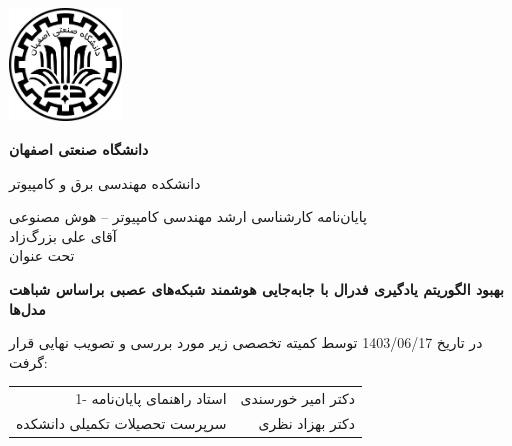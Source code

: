 \thispagestyle{empty}
\begin{center}
\includegraphics[height=3cm]{iut_logo.png}
\vspace{0.4cm}

\textbf{دانشگاه صنعتی اصفهان}\\
\vspace{0.4cm}

{\large
	دانشکده مهندسی برق و کامپیوتر
}
\vspace{1.8cm}

\vfill

{\Large
	پایان‌نامه کارشناسی ارشد مهندسی کامپیوتر --
	هوش مصنوعی ‎\\
	\vspace{.2cm}
	آقای علی بزرگ‌زاد
	\\
	\vspace{.3cm}
	تحت عنوان\\
}


\end{center}
\vfill
\vspace{2.5cm}

{\large
	\noindent
	\textbf{
	بهبود الگوریتم یادگیری فدرال با جابه‌جایی هوشمند شبکه‌های عصبی براساس شباهت مدل‌ها
	}
}

\vspace*{2cm}

در تاریخ 1403/06/17 توسط کمیته تخصصی زیر مورد بررسی و تصویب نهایی قرار گرفت:\\
\vspace{0.8cm}

{\normalsize
	
	\begin{tabular}{rr}
	\vspace*{.8cm}
	1- استاد راهنمای پایان‌نامه  & \hspace{2cm} دکتر امیر خورسندی \\
	\vspace{.8cm}
	سرپرست تحصیلات تکمیلی دانشکده &\hspace{2cm} دکتر بهزاد نظری \\
	\end{tabular}
}
\restoregeometry
\pagebreak

